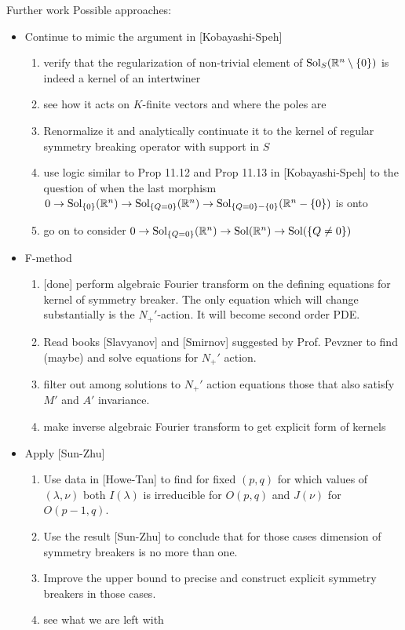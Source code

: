 \documentclass[8pt]{beamer}
\newcommand{\Sol}{\mbox{Sol}}
\theoremstyle{mystyle}
\begin{document}
\begin{frame}{Further work}%
	Possible approaches:
	\begin{itemize}
		\item Continue to mimic the argument in [Kobayashi-Speh]
			\begin{enumerate}
				\item verify that the regularization of non-trivial element of $\Sol_S(\R^n\setminus\mycbra{ 0 })$
					is indeed a kernel of an intertwiner
				\item see how it acts on $K$-finite vectors and where the poles are
				\item Renormalize it and analytically continuate it to the kernel of 
					regular symmetry breaking operator with support in $S$
				\item use logic similar to Prop 11.12 and Prop 11.13 in [Kobayashi-Speh] to 
					the question of when the last morphism
	$0\rightarrow\Sol_{\mycbra{0}}(\R^n)\rightarrow\Sol_{\mycbra{Q=0}}(\R^n)\rightarrow
	\Sol_{\mycbra{Q=0}-\mycbra{0}}(\R^n-\mycbra{0})$
	is onto
				\item go on to consider 
				$0\rightarrow\Sol_{\mycbra{ Q=0 }}(\R^n)\rightarrow\Sol(\R^n)\rightarrow
				\Sol(\mycbra{Q\neq0})$
			\end{enumerate}
		\item F-method
			\begin{enumerate}
				\item {[done]} perform algebraic Fourier transform on the defining equations for kernel of symmetry
					breaker. The only equation which will change substantially is the $N_+'$-action. It will
					become second order PDE.
				\item Read books [Slavyanov] and [Smirnov] suggested by Prof. Pevzner to find (maybe) and solve
					equations for $N_+'$ action.
				\item filter out among solutions to $N_+'$ action equations those that also satisfy $M'$ and $A'$
					invariance.
				\item make inverse algebraic Fourier transform to get explicit form of kernels
			\end{enumerate}
		\item Apply [Sun-Zhu]
			\begin{enumerate}
				\item Use data in [Howe-Tan] to find for fixed $(p,q)$ for which values of $(\lambda,\nu)$ both
					$I(\lambda)$ is irreducible for $O(p,q)$ and $J(\nu)$ for $O(p-1,q)$.
				\item Use the result [Sun-Zhu] to conclude that for those cases dimension of symmetry breakers
					is no more than one.
				\item Improve the upper bound to precise and construct explicit symmetry breakers in those cases.
				\item see what we are left with
			\end{enumerate}
	\end{itemize}
\end{frame}
\end{document}
